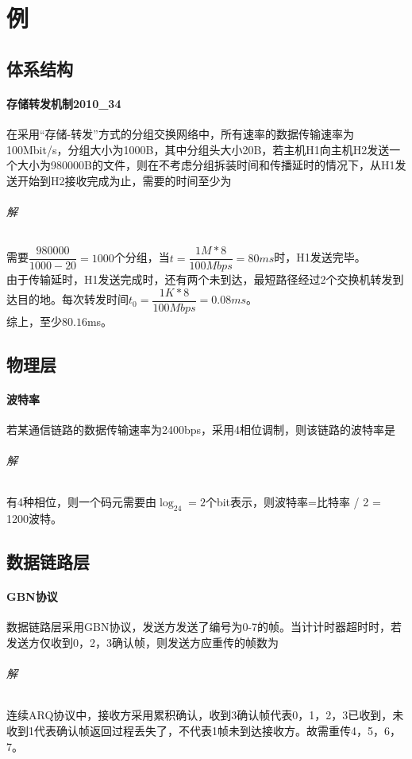 
\chapter{例}

\section{体系结构}

\subsubsection{存储转发机制2010\_34}
在采用“存储-转发”方式的分组交换网络中，所有速率的数据传输速率为100Mbit/s，分组大小为1000B，其中分组头大小20B，若主机H1向主机H2发送一个大小为980000B的文件，则在不考虑分组拆装时间和传播延时的情况下，从H1发送开始到H2接收完成为止，需要的时间至少为

\subparagraph{解}
需要\(\dfrac{980000}{1000 - 20} = 1000\)个分组，当\(t = \dfrac{1M * 8}{100Mbps} = 80ms\)时，H1发送完毕。 \\
由于传输延时，H1发送完成时，还有两个未到达，最短路径经过2个交换机转发到达目的地。每次转发时间\(t_0 = \dfrac{1K * 8}{100Mbps} = 0.08ms\)。 \\
综上，至少\(80.16\)ms。


\section{物理层}

\subsubsection{波特率}
若某通信链路的数据传输速率为2400bps，采用4相位调制，则该链路的波特率是

\subparagraph{解}
有4种相位，则一个码元需要由\(\log_24=2\)个bit表示，则波特率=比特率 / 2 = 1200波特。


\section{数据链路层}

\subsubsection{GBN协议}
数据链路层采用GBN协议，发送方发送了编号为0-7的帧。当计计时器超时时，若发送方仅收到0，2，3确认帧，则发送方应重传的帧数为

\subparagraph{解}
连续ARQ协议中，接收方采用累积确认，收到3确认帧代表0，1，2，3已收到，未收到1代表确认帧返回过程丢失了，不代表1帧未到达接收方。故需重传4，5，6，7。


